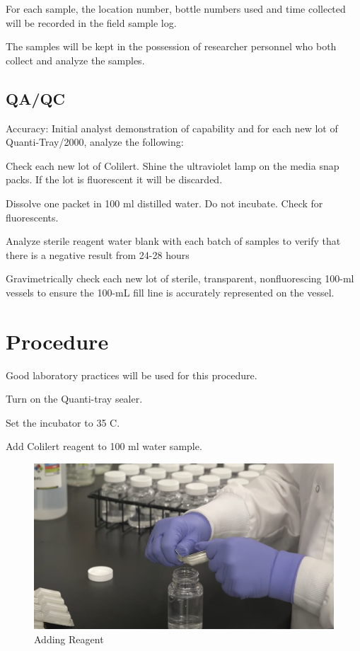 \documentclass[12pt]{../SOP4_alpha}\usepackage[]{graphicx}\usepackage[]{xcolor}
\begin{document}
\NP For each sample, the location number, bottle numbers used and time
collected will be recorded in the field sample log.

\NP The samples will be kept in the possession of researcher personnel who both
collect and analyze the samples.


\subsection{QA/QC}

\NP Accuracy: Initial analyst demonstration of capability and for each new lot of
Quanti-Tray/2000, analyze the following:

\NP Check each new lot of Colilert. Shine the ultraviolet lamp on the media snap packs. If the lot is
fluorescent it will be discarded.

\NP Dissolve one packet in 100 ml distilled water. Do not incubate.
Check for fluorescents.

\NP Analyze sterile reagent water blank with each batch of samples to
verify that there is a negative result from 24-28 hours

\NP Gravimetrically check each new lot of sterile, transparent, nonfluorescing 
100-ml vessels to ensure the 100-mL fill line is
accurately represented on the vessel. 

\section{Procedure}

Good laboratory practices will be used for this procedure.

\NP Turn on the Quanti-tray sealer. 

\NP Set the incubator to 35 \degree C.

\NP Add Colilert reagent to 100 ml water sample.

\begin{figure}[h]
\includegraphics[width=1.0\textwidth]{figures/AddingReagent.png}
\caption{Adding Reagent}
\label{fig:Adding Reagent}
\end{figure}
\end{document}
